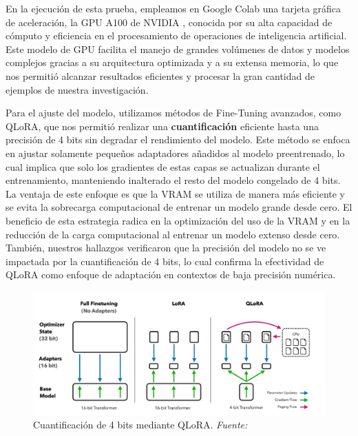 En la ejecución de esta prueba, empleamos en Google Colab una tarjeta gráfica de aceleración, la GPU A100 de NVIDIA \cite{A100}, conocida por su alta capacidad de cómputo y eficiencia en el procesamiento de operaciones de inteligencia artificial. Este modelo de \acrshort{GPU} facilita el manejo de grandes volúmenes de datos y modelos complejos gracias a su arquitectura optimizada y a su extensa memoria, lo que nos permitió alcanzar resultados eficientes y procesar la gran cantidad de ejemplos de nuestra investigación.

\bigskip %

Para el ajuste del modelo, utilizamos métodos de Fine-Tuning avanzados, como \gls{QLoRA}, que nos permitió realizar una \textbf{cuantificación} eficiente hasta una precisión de 4 bits sin degradar el rendimiento del modelo. Este método se enfoca en ajustar solamente pequeños adaptadores añadidos al modelo preentrenado, lo cual implica que solo los \gls{gradiente}s de estas capas se actualizan durante el entrenamiento, manteniendo inalterado el resto del modelo congelado de 4 bits. La ventaja de este enfoque es que la \acrshort{VRAM} se utiliza de manera más eficiente y se evita la sobrecarga computacional de entrenar un modelo grande desde cero. El beneficio de esta estrategia radica en la optimización del uso de la \acrshort{VRAM} y en la reducción de la carga computacional al entrenar un modelo extenso desde cero. También, nuestros hallazgos verificaron que la precisión del modelo no se ve impactada por la cuantificación de 4 bits, lo cual confirma la efectividad de \gls{QLoRA} como enfoque de adaptación en contextos de baja precisión numérica.

\bigskip %

\begin{figure}[htbp!]
  \centering
  \includegraphics[width=\textwidth,keepaspectratio]{imaxes/5_QLORA.png}
  \caption[Cuantificación de 4 bits mediante QLoRA]{Cuantificación de 4 bits mediante QLoRA. \textit{Fuente: \cite{Mercity2024FineTuning}}}
  \label{fig:5_QLORA.png}
\end{figure}


